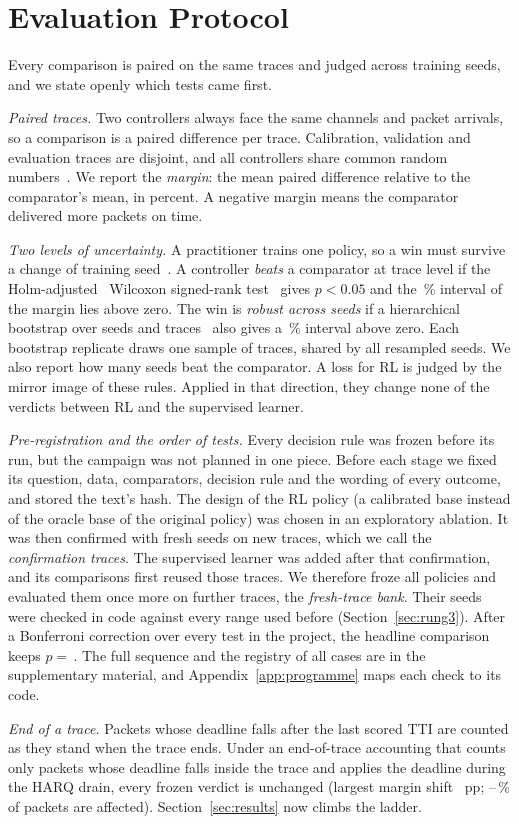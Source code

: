 \section{Evaluation Protocol}\label{sec:protocol}
Every comparison is paired on the same traces and judged across training seeds, and we state openly which tests came first.

\emph{Paired traces.} Two controllers always face the same channels and packet arrivals, so a comparison is a paired difference per trace. Calibration, validation and evaluation traces are disjoint, and all controllers share common random numbers~\cite{glasserman1992crn}. We report the \emph{margin}: the mean paired difference relative to the comparator's mean, in percent. A negative margin means the comparator delivered more packets on time.

\emph{Two levels of uncertainty.} A practitioner trains one policy, so a win must survive a change of training seed~\cite{henderson2018matters,agarwal2021precipice}. A controller \emph{beats} a comparator at trace level if the Holm-adjusted~\cite{holm1979} Wilcoxon signed-rank test~\cite{wilcoxon1945} gives $p<0.05$ and the \NLevTrace\,\% interval of the margin lies above zero. The win is \emph{robust across seeds} if a hierarchical bootstrap over seeds and traces~\cite{saravanan2019hierboot} also gives a \NLevHier\,\% interval above zero. Each bootstrap replicate draws one sample of traces, shared by all resampled seeds. We also report how many seeds beat the comparator. A loss for RL is judged by the mirror image of these rules. Applied in that direction, they change none of the \NSsymN{} verdicts between RL and the supervised learner.

\emph{Pre-registration and the order of tests.} Every decision rule was frozen before its run, but the campaign was not planned in one piece. Before each stage we fixed its question, data, comparators, decision rule and the wording of every outcome, and stored the text's hash. The design of the RL policy (a calibrated base instead of the oracle base of the original policy) was chosen in an exploratory ablation. It was then confirmed with fresh seeds on \NCfgEval{} new traces, which we call the \emph{confirmation traces}. The supervised learner was added after that confirmation, and its comparisons first reused those traces. We therefore froze all policies and evaluated them once more on \NCfgEval{} further traces, the \emph{fresh-trace bank}. Their seeds were checked in code against every range used before (Section~\ref{sec:rung3}). After a Bonferroni correction over every test in the project, the headline comparison keeps $p={}$\,\NBonfPProjGbtResAck. The full sequence and the registry of all \NProjCases{} cases are in the supplementary material, and Appendix~\ref{app:programme} maps each check to its code.

\emph{End of a trace.} Packets whose deadline falls after the last scored TTI are counted as they stand when the trace ends. Under an end-of-trace accounting that counts only packets whose deadline falls inside the trace and applies the deadline during the HARQ drain, every frozen verdict is unchanged (largest margin shift \NEotMaxShift~pp; \NEotExpMin--\NEotExpMax\,\% of packets are affected). Section~\ref{sec:results} now climbs the ladder.
